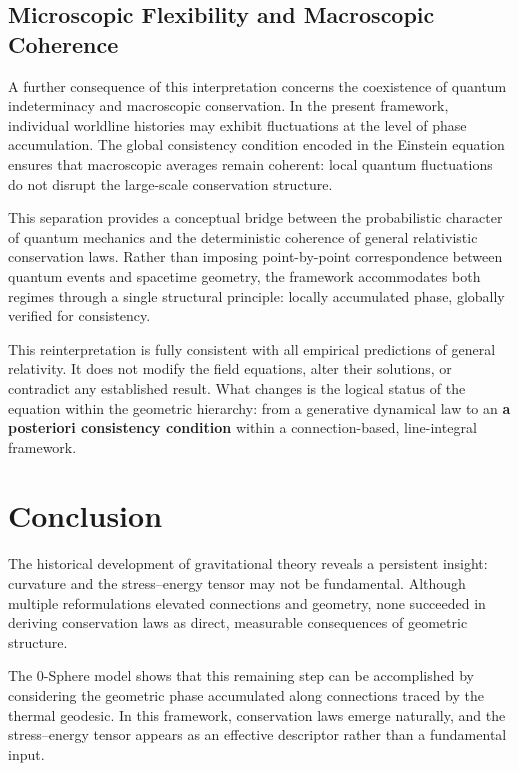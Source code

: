 \documentclass[%
 reprint,
 amsmath,amssymb,
 aps,
 prb,
]{revtex4-2}
\numberwithin{equation}{section}
\begin{document}
\subsection{Microscopic Flexibility and Macroscopic Coherence}
\label{subsec:micro_macro}

A further consequence of this interpretation concerns the coexistence of quantum indeterminacy and macroscopic conservation. In the present framework, individual worldline histories may exhibit fluctuations at the level of phase accumulation. The global consistency condition encoded in the Einstein equation ensures that macroscopic averages remain coherent: local quantum fluctuations do not disrupt the large-scale conservation structure.

This separation provides a conceptual bridge between the probabilistic character of quantum mechanics and the deterministic coherence of general relativistic conservation laws. Rather than imposing point-by-point correspondence between quantum events and spacetime geometry, the framework accommodates both regimes through a single structural principle: locally accumulated phase, globally verified for consistency.

This reinterpretation is fully consistent with all empirical predictions of general relativity. It does not modify the field equations, alter their solutions, or contradict any established result. What changes is the logical status of the equation within the geometric hierarchy: from a generative dynamical law to an \textbf{a posteriori consistency condition} within a connection-based, line-integral framework.

\section{Conclusion}
\label{sec:conclusion}

The historical development of gravitational theory reveals a persistent insight: curvature and the stress--energy tensor may not be fundamental. 
Although multiple reformulations elevated connections and geometry, none succeeded in deriving conservation laws as direct, measurable consequences of geometric structure.

The 0-Sphere model shows that this remaining step can be accomplished by considering the geometric phase accumulated along connections traced by the thermal geodesic. 
In this framework, conservation laws emerge naturally, and the stress--energy tensor appears as an effective descriptor rather than a fundamental input.
\end{document}
